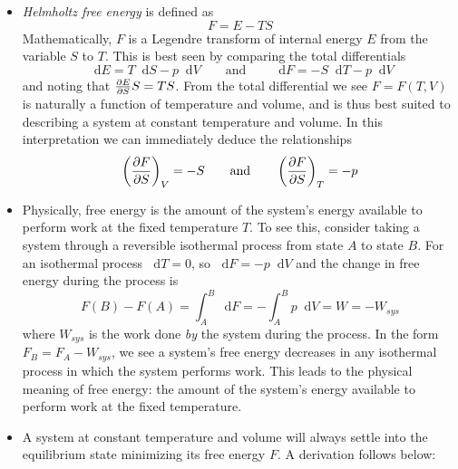 \documentclass[11pt, a4paper]{article}
\newcommand{\eqtext}[1]{\qquad \text{#1} \qquad}
\newcommand{\diff}{\mathop{}\!\mathrm{d}} %
\newcommand{\pdveval}[3]{\left(\pdv{#1}{#2}\right)_{#3}}
\begin{document}
\begin{itemize}
	\item \textit{Helmholtz free energy} is defined as
	\begin{equation*}
		F = E - TS
	\end{equation*}
	Mathematically, $ F $ is a Legendre transform of internal energy $ E $ from the variable $ S $ to $ T $. This is best seen by comparing the total differentials
	\begin{equation*}
		\diff E = T \diff S - p \diff V \eqtext{and} \diff F = - S \diff T - p \diff V
	\end{equation*}
	and noting that $ \pdv{E}{S}S = TS $. From the total differential we see $ F = F(T, V) $ is naturally a function of temperature and volume, and is thus best suited to describing a system at constant temperature and volume. In this interpretation we can immediately deduce the relationships
	\begin{equation*}
		\pdveval{F}{S}{V} = - S \qquad \text{and} \qquad 	\pdveval{F}{S}{T} = - p
	\end{equation*}
	
	\item Physically, free energy is the amount of the system's energy available to perform work at the fixed temperature $ T $. To see this, consider taking a system through a reversible isothermal process from state $ A $ to state $ B $. For an isothermal process $ \diff T = 0 $, so $ \diff F = - p\diff V $ and the change in free energy during the process is
	\begin{equation*}
		F(B) - F(A) = \int_{A}^{B} \diff F = - \int_{A}^{B} p \diff V = W = -W_{sys}
	\end{equation*}
	where $ W_{sys} $ is the work done \textit{by} the system during the process. In the form $ F_{B} = F_{A} - W_{sys} $, we see a system's free energy decreases in any isothermal process in which the system performs work. This leads to the physical meaning of free energy: the amount of the system's energy available to perform work at the fixed temperature.
	

	
	\item A system at constant temperature and volume will always settle into the equilibrium state minimizing its free energy $ F $. A derivation follows below:
	

\end{itemize}
\end{document}
